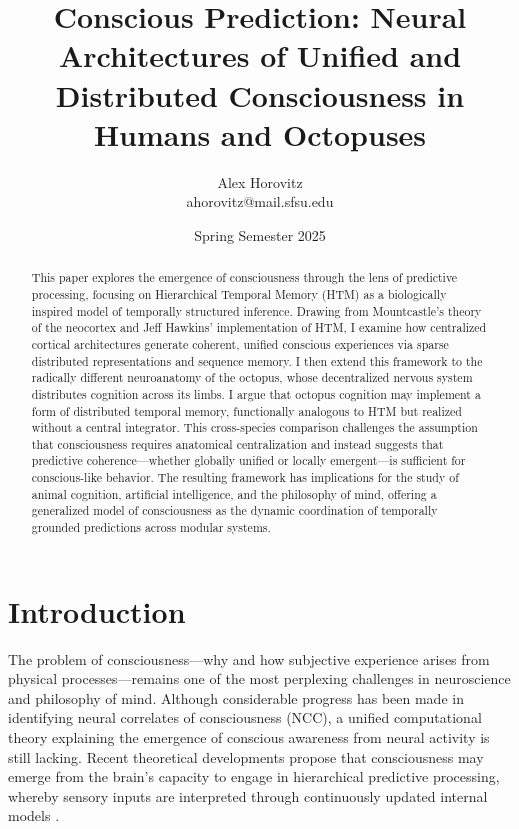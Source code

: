 \documentclass{article}
\title{Conscious Prediction: Neural Architectures of Unified and Distributed Consciousness in Humans and Octopuses}
\author{Alex Horovitz \\ \small ahorovitz@mail.sfsu.edu}
\date{Spring Semester 2025}
\begin{document}
\setlength{\parskip}{0.75em}
\maketitle
\begin{abstract}
This paper explores the emergence of consciousness through the lens of predictive processing, focusing on Hierarchical Temporal Memory (HTM) as a biologically inspired model of temporally structured inference. Drawing from Mountcastle’s theory of the neocortex and Jeff Hawkins’ implementation of HTM, I examine how centralized cortical architectures generate coherent, unified conscious experiences via sparse distributed representations and sequence memory. I then extend this framework to the radically different neuroanatomy of the octopus, whose decentralized nervous system distributes cognition across its limbs. I argue that octopus cognition may implement a form of distributed temporal memory, functionally analogous to HTM but realized without a central integrator. This cross-species comparison challenges the assumption that consciousness requires anatomical centralization and instead suggests that predictive coherence—whether globally unified or locally emergent—is sufficient for conscious-like behavior. The resulting framework has implications for the study of animal cognition, artificial intelligence, and the philosophy of mind, offering a generalized model of consciousness as the dynamic coordination of temporally grounded predictions across modular systems.
\end{abstract}


\section{Introduction}

The problem of consciousness---why and how subjective experience arises from physical processes---remains one of the most perplexing challenges in neuroscience and philosophy of mind. Although considerable progress has been made in identifying neural correlates of consciousness (NCC), a unified computational theory explaining the emergence of conscious awareness from neural activity is still lacking. Recent theoretical developments propose that consciousness may emerge from the brain's capacity to engage in hierarchical predictive processing, whereby sensory inputs are interpreted through continuously updated internal models \parencite{clark2016surfing, friston2010free}.
\end{document}
